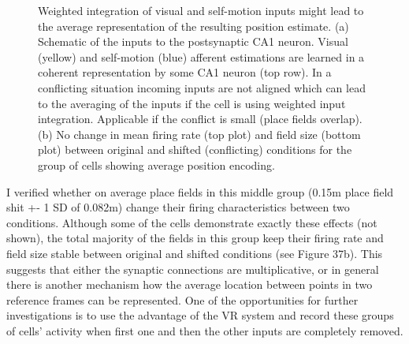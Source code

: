 \begin{figure}
\captionsetup{format=plain}
\caption[Effects of a conflict after learning]{
Weighted integration of visual and self-motion inputs might lead to the average representation of the resulting position estimate. (a) Schematic of the inputs to the postsynaptic CA1 neuron. Visual (yellow) and self-motion (blue) afferent estimations are learned in a coherent representation by some CA1 neuron (top row). In a conflicting situation incoming inputs are not aligned which can lead to the averaging of the inputs if the cell is using weighted input integration. Applicable if the conflict is small (place fields overlap). (b) No change in mean firing rate (top plot) and field size (bottom plot) between original and shifted (conflicting) conditions for the group of cells showing average position encoding.
}
\label{fig:F37_encoding_average}
\end{figure}

I verified whether on average place fields in this middle group (0.15m place field shit +- 1 SD of 0.082m) change their firing characteristics between two conditions. Although some of the cells demonstrate exactly these effects (not shown), the total majority of the fields in this group keep their firing rate and field size stable between original and shifted conditions (see Figure 37b). This suggests that either the synaptic connections are multiplicative, or in general there is another mechanism how the average location between points in two reference frames can be represented. One of the opportunities for further investigations is to use the advantage of the VR system and record these groups of cells’ activity when first one and then the other inputs are completely removed.


